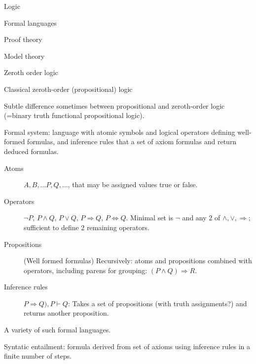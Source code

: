 \begin{plSection}{Logic}
\begin{plSection}{Formal languages}
\cite{DutilhNovaes:2012:FormalLanguages}

\end{plSection}%
\begin{plSection}{Proof theory}
\label{sec:Proof_theory}

\end{plSection}%
\begin{plSection}{Model theory}
\label{sec:Model_theory}

\end{plSection}%
\begin{plSection}{Zeroth order logic}
\label{sec:Zeroth_order_logic}

Classical zeroth-order (propositional) 
logic~\cite{iep:PropositionalLogic,
wiki:PropositionalCalculus,
wiki:ZerothOrderLogic}

Subtle difference sometimes between propositional
and zeroth-order logic 
(=binary truth functional propositional logic).

Formal system:
language with atomic symbols
and logical operators defining well-formed formulas,
and inference rules that a set of axiom formulas 
and return deduced formulas.
\begin{description}
\item[Atoms]  $A, B, \ldots P, Q, \ldots$, 
that may be assigned values \textsf{true} or \textsf{false}.

\item[Operators] $\lnot P$, $P \wedge Q$, $P \vee Q$, 
$P \Rightarrow Q$, $P \Leftrightarrow Q$. 
Minimal set is $\lnot$ and 
any $2$ of  $\wedge, \vee, \Rightarrow$;
sufficient to define $2$ remaining operators.

\item[Propositions] (Well formed formulas)
Recursively: atoms and propositions combined with operators,
including parens for grouping: $(P \wedge Q) \Rightarrow R$.

\item[Inference rules] ${P \Rightarrow Q), P} \vdash Q$:
Takes a set of propositions (with truth assignments?)
and returns another proposition.
\end{description}

A variety of such formal languages.

Syntatic entailment: formula derived from set of axioms 
using inference rules in a finite number of steps.


\end{plSection}
\end{plSection}
